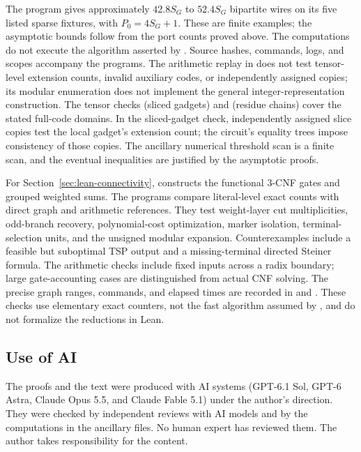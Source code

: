 The program  gives approximately $42.8S_G$ to
$52.4S_G$ bipartite wires on its five listed sparse fixtures, with
$P_0=4S_G+1$. These are finite examples; the asymptotic bounds follow
from the port counts proved above. The computations do not execute
the algorithm asserted by \HTC. Source hashes, commands, logs,
and scopes accompany the programs.
The arithmetic replay in  does not test
tensor-level extension counts, invalid auxiliary codes, or independently
assigned copies; its modular enumeration does not implement the general
integer-representation construction.
The tensor checks  (sliced gadgets) and
 (residue chains) cover the stated full-code
domains. In the sliced-gadget check, independently assigned slice copies test the local gadget's
extension count; the circuit's equality trees impose consistency of
those copies. The ancillary numerical threshold scan is a finite scan,
and the eventual inequalities are justified by the asymptotic proofs.

For Section~\ref{sec:lean-connectivity}, 
constructs the functional 3-CNF gates and grouped weighted sums.
The  programs compare literal-level exact
counts with direct graph and arithmetic references. They test
weight-layer cut multiplicities, odd-branch recovery, polynomial-cost
optimization, marker isolation, terminal-selection units, and the
unsigned modular expansion. Counterexamples include a feasible but
suboptimal TSP output and a missing-terminal directed Steiner formula.
The arithmetic checks include fixed inputs across a radix boundary;
large gate-accounting cases are distinguished from actual CNF solving.
The precise graph ranges, commands, and elapsed times are recorded in
 and .
These checks use elementary exact counters, not the fast algorithm
assumed by \HLean, and do not formalize the reductions in Lean.

\noindent\begin{minipage}{\linewidth}
\subsection*{Use of AI}
The proofs and the text were produced with AI systems (GPT-6.1 Sol,
GPT-6 Astra, Claude Opus 5.5, and Claude Fable 5.1) under the author's
direction. They were checked by independent reviews with AI models and by the
computations in the ancillary files. No human expert has reviewed
them. The author takes responsibility for the content.
\end{minipage}\par
